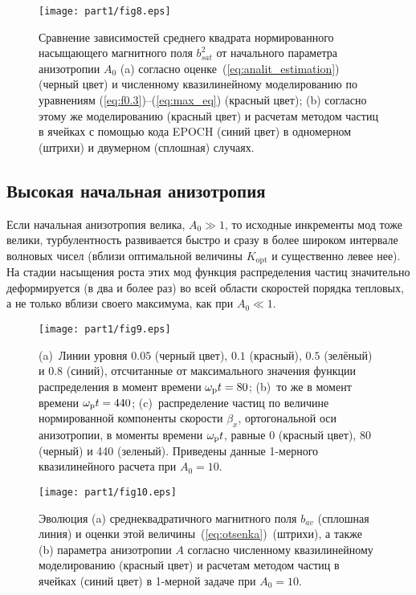 \begin{figure}[t]
\centering
\texttt{[image: part1/fig8.eps]}
\caption{Сравнение зависимостей среднего квадрата нормированного насыщающего магнитного поля $b_{sat}^2$ от начального параметра анизотропии $A_0$ (a) согласно оценке~(\ref{eq:analit_estimation}) (черный цвет) и численному квазилинейному моделированию по уравнениям (\ref{eq:f0.3})--(\ref{eq:max_eq}) (красный цвет); (b) согласно этому же моделированию (красный цвет) и расчетам методом частиц в ячейках с помощью кода EPOCH (синий цвет) в одномерном (штрихи) и двумерном (сплошная) случаях.}
\label{fig:bsat}
\end{figure}


\subsection{Высокая начальная анизотропия}\label{subsec:high_A_1d}

Если начальная анизотропия велика, $A_0\gg 1$, то исходные инкременты мод тоже велики, турбулентность развивается быстро и сразу в более широком интервале волновых чисел (вблизи оптимальной величины $K_\mathrm{opt}$ и существенно левее нее). На стадии насыщения роста этих мод функция распределения частиц значительно деформируется (в два и более раз) во всей области скоростей порядка тепловых, а не только вблизи своего максимума, как при $A_0\ll 1$. 
\begin{figure}[b]
\centering
\texttt{[image: part1/fig9.eps]}
\caption{(a)~Линии уровня $0.05$ (черный цвет), $0.1$ (красный), $0.5$ (зелёный) и $0.8$ (синий), отсчитанные от максимального значения функции распределения в момент времени $\omega_\mathrm{p} t =80$; (b)~то же в момент времени $\omega_\mathrm{p} t =440$; (c)~распределение частиц по величине нормированной компоненты скорости $\beta_x$, ортогональной оси анизотропии, в моменты времени $\omega_\mathrm{p} t$, равные 0 (красный цвет), 80 (черный) и 440 (зеленый). Приведены данные 1-мерного квазилинейного расчета при $A_0=10$.}
\label{fig:sravnenie_FR1d_A10}
\end{figure}
\begin{figure}[b]
\centering
\texttt{[image: part1/fig10.eps]}
\caption{Эволюция (a) среднеквадратичного магнитного поля $b_{av}$ (сплошная линия) и оценки этой величины~(\ref{eq:otsenka})~(штрихи), а также (b) параметра анизотропии $A$ согласно численному квазилинейному моделированию (красный цвет) и расчетам методом частиц в ячейках (синий цвет) в 1-мерной задаче при $A_0=10$.}
\label{fig:evol1d_QL_A10}
\end{figure}

